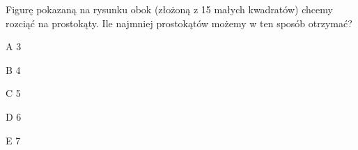 \begin{tresc}
Figurę pokazaną na rysunku obok (złożoną z 15 małych kwadratów) chcemy rozciąć na prostokąty. Ile najmniej prostokątów możemy w ten sposób otrzymać?
\end{tresc}
\begin{wariant}{A} 3 \end{wariant}
\begin{wariant}{B} 4 \end{wariant}
\begin{wariant}{C} 5 \end{wariant}
\begin{wariant}{D} 6 \end{wariant}
\begin{wariant}{E} 7 \end{wariant}
